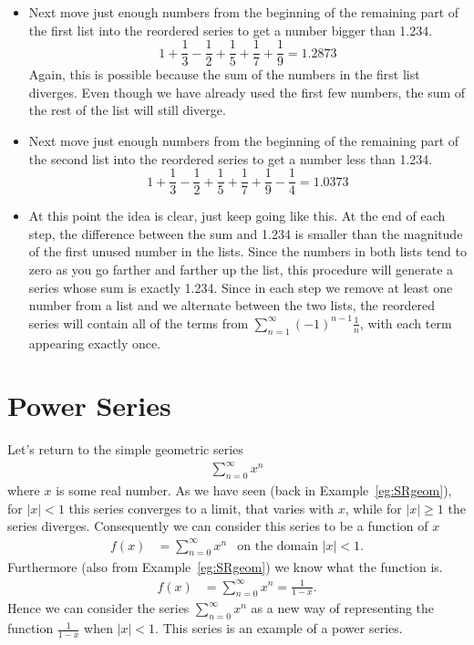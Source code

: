 \begin{eg}
\begin{itemize}
\item
Next move just enough numbers from the beginning of the remaining part
of the first list into the reordered series to get a number bigger than 1.234.
\begin{equation*}
1+\frac{1}{3}-\frac{1}{2} +\frac{1}{5}+\frac{1}{7}+\frac{1}{9} = 1.2873
\end{equation*}
Again, this is possible because the sum of the numbers in the first
list diverges. Even though we have already used the first few numbers,
the sum of the rest of the list will still diverge.

\item Next move just enough numbers from the beginning of the remaining
part of the second list into the reordered series to get a number
less than 1.234.
\begin{equation*}
1+\frac{1}{3}-\frac{1}{2} +\frac{1}{5}+\frac{1}{7}+\frac{1}{9} -\frac{1}{4}
= 1.0373
\end{equation*}

\item At this point the idea is clear, just keep going like this. At
the end of each step, the difference between the sum and 1.234 is smaller
than the magnitude of the first unused number in the lists. Since
the numbers in both lists tend to zero as you go farther and farther
up the list, this procedure will generate a series whose sum is
exactly 1.234. Since in each step we remove at least one number from
a list and we alternate between the two lists, the reordered series
will contain all of the terms from $\sum\limits_{n=1}^\infty(-1)^{n-1}\frac{1}{n}$,
with each term appearing exactly once.
\end{itemize}

\end{eg}


\section{Power Series}

Let's return to the simple geometric series
\begin{align*}
  \sum_{n=0}^\infty x^n
\end{align*}
where $x$ is some real number. As we have seen (back in
Example~\ref{eg:SRgeom}), for $|x|<1$ this
series converges to a limit, that varies with $x$,
while for $|x|\geq 1$ the series diverges.
Consequently we can consider this series to be a function of $x$
\begin{align*}
    f(x) &= \sum_{n=0}^\infty x^n & \text{on the domain $|x|<1$}.
\end{align*}
Furthermore (also from Example~\ref{eg:SRgeom}) we know what the function is.
\begin{align*}
  f(x) &= \sum_{n=0}^\infty x^n = \frac{1}{1-x}.
\end{align*}
Hence we can consider the series $\sum_{n=0}^\infty x^n$ as a new way
of representing the function $\frac{1}{1-x}$ when $|x|<1$. This series
is an example of a power series.


